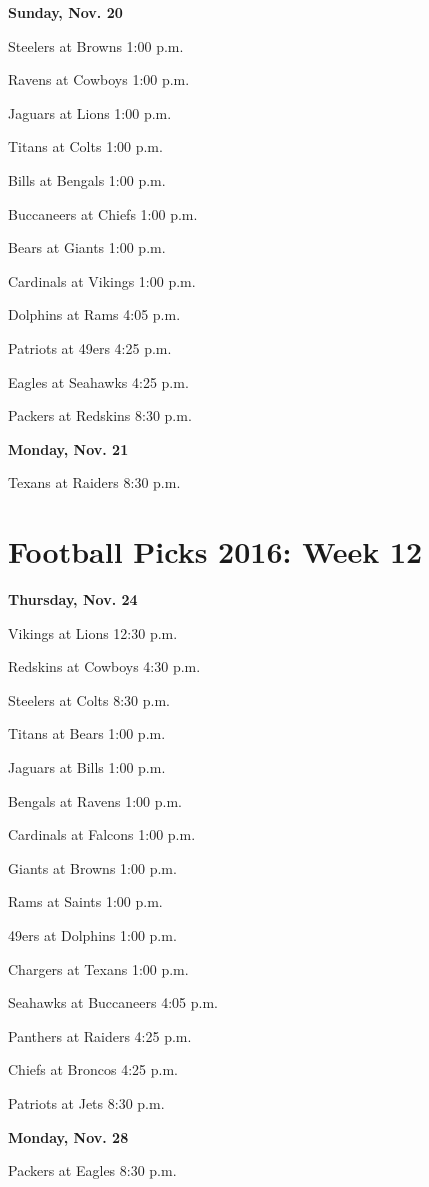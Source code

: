 \documentclass[12pt, letterpaper]{article}
\begin{document}
\noindent \Large \textbf{Sunday, Nov. 20} \par
Steelers at Browns 1:00 p.m.\par
Ravens at Cowboys 1:00 p.m.\par
Jaguars at Lions 1:00 p.m.\par
Titans at Colts 1:00 p.m.\par
Bills at Bengals 1:00 p.m.\par
Buccaneers at Chiefs 1:00 p.m.\par
Bears at Giants 1:00 p.m.\par
Cardinals at Vikings 1:00 p.m.\par
Dolphins at Rams 4:05 p.m.\par
Patriots at 49ers 4:25 p.m.\par
Eagles at Seahawks 4:25 p.m.\par
Packers at Redskins 8:30 p.m.\par
\noindent \Large \textbf{Monday, Nov. 21} \par
Texans at Raiders 8:30 p.m.\par
\newpage \section*{\Huge Football Picks 2016: Week 12}
\noindent \Large \textbf{Thursday, Nov. 24} \par
Vikings at Lions 12:30 p.m.\par
Redskins at Cowboys 4:30 p.m.\par
Steelers at Colts 8:30 p.m.\par
Titans at Bears 1:00 p.m.\par
Jaguars at Bills 1:00 p.m.\par
Bengals at Ravens 1:00 p.m.\par
Cardinals at Falcons 1:00 p.m.\par
Giants at Browns 1:00 p.m.\par
Rams at Saints 1:00 p.m.\par
49ers at Dolphins 1:00 p.m.\par
Chargers at Texans 1:00 p.m.\par
Seahawks at Buccaneers 4:05 p.m.\par
Panthers at Raiders 4:25 p.m.\par
Chiefs at Broncos 4:25 p.m.\par
Patriots at Jets 8:30 p.m.\par
\noindent \Large \textbf{Monday, Nov. 28} \par
Packers at Eagles 8:30 p.m.\par
\end{document}
